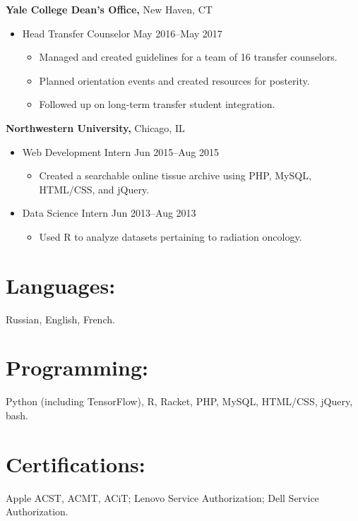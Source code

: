 \documentclass[11pt]{article}
\newcommand{\position}[2]{#1 \hfill #2}
\newcommand{\emphasized}[2]{\emphasis{#1} \medemph{#2}}
\newcommand{\heading}[1]{\section*{#1}}
\newcommand{\emphasis}[1]{\textbf{\textsf{#1}}}
\newcommand{\medemph}[1]{\textsf{#1}}
\newenvironment{experience}{
	\begin{itemize}[leftmargin=*, topsep=0pt] %
		\setlength{\itemsep}{0pt} %
		\setlength{\parskip}{0pt} %
		\setlength{\parsep}{10pt} %
	}{
	\end{itemize}
}
\begin{document}
\emphasized{Yale College Dean's Office,}{New Haven, CT}
\begin{experience}
	\item \position{Head Transfer Counselor}{May 2016--May 2017}
	\begin{experience}
		\item Managed and created guidelines for a team of 16 transfer counselors.
		\item Planned orientation events and created resources for posterity.
		\item Followed up on long-term transfer student integration.\\ 
	\end{experience}
\end{experience}


\emphasized{Northwestern University,}{Chicago, IL}
\begin{experience}
	\item \position{Web Development Intern}{Jun 2015--Aug 2015}
	\begin{experience}
		\item Created a searchable online tissue archive using PHP, MySQL, HTML/CSS, and jQuery.
	\end{experience}
	\item \position{Data Science Intern}{Jun 2013--Aug 2013}
	\begin{experience}
		\item Used R to analyze datasets pertaining to radiation oncology.
	\end{experience}
\end{experience}

\heading{Languages:} Russian, English, French.
\heading{Programming:} Python (including TensorFlow), R, Racket, PHP, MySQL, HTML/CSS, jQuery, bash.
\heading{Certifications:} Apple ACST, ACMT, ACiT; Lenovo Service Authorization; Dell Service Authorization.
\end{document}
